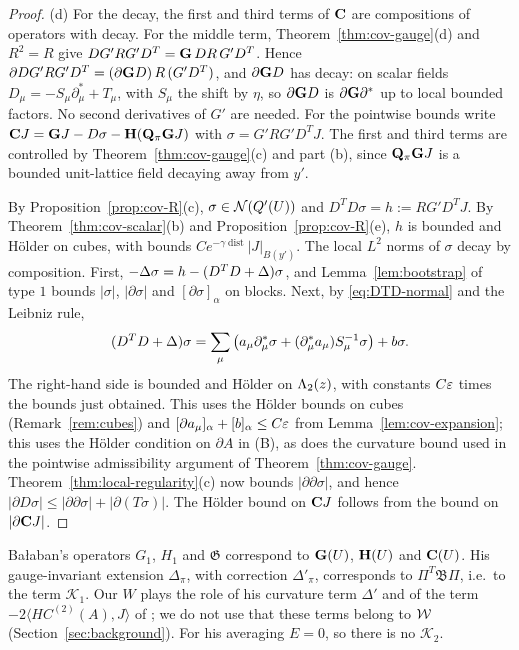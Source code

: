 \begin{proof}
(d) For the decay, the first and third terms of $\mathbf C$ are compositions of operators with decay. For the middle term, Theorem~\ref{thm:cov-gauge}(d) and $R^2=R$ give $DG'RG'D^T=\mathbf G\,DR\,G'D^T$. Hence $\partial DG'RG'D^T=(\partial\mathbf G D)\,R\,(G'D^T)$, and $\partial\mathbf G D$ has decay: on scalar fields $D_\mu=-S_\mu\partial^*_\mu+T_\mu$, with $S_\mu$ the shift by $\eta$, so $\partial\mathbf G D$ is $\partial\mathbf G\partial^*$ up to local bounded factors. No second derivatives of $G'$ are needed. For the pointwise bounds write $\mathbf C J=\mathbf G J-D\sigma-\mathbf H(\mathbf Q_\pi\mathbf G J)$ with $\sigma=G'RG'D^TJ$. The first and third terms are controlled by Theorem~\ref{thm:cov-gauge}(c) and part (b), since $\mathbf Q_\pi\mathbf G J$ is a bounded unit-lattice field decaying away from $y'$.

By Proposition~\ref{prop:cov-R}(c), $\sigma\in\mathcal N(Q'(U))$ and $D^TD\sigma=h:=RG'D^TJ$. By Theorem~\ref{thm:cov-scalar}(b) and Proposition~\ref{prop:cov-R}(e), $h$ is bounded and H\"older on cubes, with bounds $Ce^{-\gamma\operatorname{dist}}|J|_{B(y')}$. The local $L^2$ norms of $\sigma$ decay by composition. First, $-\Delta\sigma=h-(D^TD+\Delta)\sigma$, and Lemma~\ref{lem:bootstrap} of type $1$ bounds $|\sigma|$, $|\partial\sigma|$ and $[\partial\sigma]_\alpha$ on blocks. Next, by \eqref{eq:DTD-normal} and the Leibniz rule,
\[
(D^TD+\Delta)\sigma=\sum_\mu\big(a_\mu\partial^*_\mu\sigma+(\partial^*_\mu a_\mu)S_\mu^{-1}\sigma\big)+b\sigma .
\]
The right-hand side is bounded and H\"older on $\Lambda_2(z)$, with constants $C\varepsilon$ times the bounds just obtained. This uses the H\"older bounds on cubes (Remark~\ref{rem:cubes}) and $[\partial a_\mu]_\alpha+[b]_\alpha\le C\varepsilon$ from Lemma~\ref{lem:cov-expansion}; this uses the H\"older condition on $\partial A$ in (B), as does the curvature bound used in the pointwise admissibility argument of Theorem~\ref{thm:cov-gauge}. Theorem~\ref{thm:local-regularity}(c) now bounds $|\partial\partial\sigma|$, and hence $|\partial D\sigma|\le|\partial\partial\sigma|+|\partial(T\sigma)|$. The H\"older bound on $\mathbf C J$ follows from the bound on $|\partial\mathbf C J|$.
\end{proof}

\begin{remark}\label{x:16.2}
Ba\l aban's operators $G_1$, $H_1$ and $\mathfrak G$ \cite[(3.128), (3.129), (3.153)]{BalBackground} correspond to $\mathbf G(U)$, $\mathbf H(U)$ and $\mathbf C(U)$. His gauge-invariant extension $\Delta_\pi$, with correction $\Delta'_\pi$, corresponds to $\Pi^T\mathfrak B\Pi$, i.e.\ to the term $\mathcal K_1$. Our $W$ plays the role of his curvature term $\Delta'$ \cite[(3.10)]{BalBackground} and of the term $-2\langle HC^{(2)}(A),J\rangle$ of \cite[(3.128)]{BalBackground}; we do not use that these terms belong to $\mathcal W$ (Section~\ref{sec:background}). For his averaging $E=0$, so there is no $\mathcal K_2$.
\end{remark}

